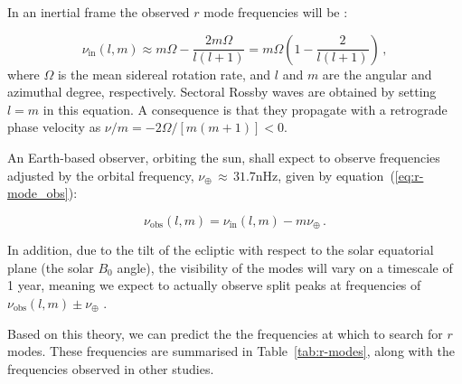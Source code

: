 In an inertial frame the observed $r$ mode frequencies will be \citep{lanza_sectoral_2019}:

\begin{equation}
\nu_{\mathrm{in}}(l,m) \approx m\Omega - \frac{2m\Omega}{l(l + 1)}  = m\Omega \left(1 - \frac{2}{l(l + 1)}\right) \, ,
\label{eq:r-mode}
\end{equation}
%
where $\Omega$ is the mean sidereal rotation rate, and $l$ and $m$ are the angular and azimuthal degree, respectively. Sectoral Rossby waves are obtained by setting $l=m$ in this equation. A consequence is that they propagate with a retrograde phase velocity as $\nu / m = -2 \Omega/[m(m + 1)] < 0$.

An Earth-based observer, orbiting the sun, shall expect to observe frequencies adjusted by the orbital frequency, $\nu_\oplus \, \approx \, 31.7$nHz, given by equation~(\ref{eq:r-mode_obs}):

\begin{equation}
\nu_{\mathrm{obs}}(l,m) = \nu_{\mathrm{in}}(l,m) - m\nu_{\oplus} \, .
\label{eq:r-mode_obs}
\end{equation}

In addition, due to the tilt of the ecliptic with respect to the solar equatorial plane (the solar $B_0$ angle), the visibility of the modes will vary on a timescale of 1 year, meaning we expect to actually observe split peaks at frequencies of $\nu_{\mathrm{obs}}(l,m) \pm \nu_{\oplus}$ \citep{lanza_sectoral_2019}.

Based on this theory, we can predict the the frequencies at which to search for $r$ modes. These frequencies are summarised in Table~\ref{tab:r-modes}, along with the frequencies observed in other studies. %

